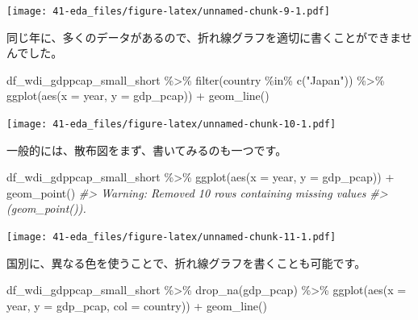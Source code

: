 \documentclass[
]{bxjsbook}
\newenvironment{Shaded}{\begin{snugshade}}{\end{snugshade}}
\newcommand{\AttributeTok}[1]{\textcolor[rgb]{0.77,0.63,0.00}{#1}}
\newcommand{\CommentTok}[1]{\textcolor[rgb]{0.56,0.35,0.01}{\textit{#1}}}
\newcommand{\FunctionTok}[1]{\textcolor[rgb]{0.00,0.00,0.00}{#1}}
\newcommand{\NormalTok}[1]{#1}
\newcommand{\SpecialCharTok}[1]{\textcolor[rgb]{0.00,0.00,0.00}{#1}}
\newcommand{\StringTok}[1]{\textcolor[rgb]{0.31,0.60,0.02}{#1}}
\theoremstyle{definition}
\theoremstyle{definition}
\theoremstyle{definition}
\theoremstyle{definition}
\theoremstyle{remark}
\begin{document}
\texttt{[image: 41-eda\_files/figure-latex/unnamed-chunk-9-1.pdf]}

同じ年に、多くのデータがあるので、折れ線グラフを適切に書くことができませんでした。

\begin{Shaded}
\begin{Highlighting}[]
\NormalTok{df\_wdi\_gdppcap\_small\_short }\SpecialCharTok{\%\textgreater{}\%} \FunctionTok{filter}\NormalTok{(country }\SpecialCharTok{\%in\%} \FunctionTok{c}\NormalTok{(}\StringTok{"Japan"}\NormalTok{)) }\SpecialCharTok{\%\textgreater{}\%}
  \FunctionTok{ggplot}\NormalTok{(}\FunctionTok{aes}\NormalTok{(}\AttributeTok{x =}\NormalTok{ year, }\AttributeTok{y =}\NormalTok{ gdp\_pcap)) }\SpecialCharTok{+} \FunctionTok{geom\_line}\NormalTok{()}
\end{Highlighting}
\end{Shaded}

\texttt{[image: 41-eda\_files/figure-latex/unnamed-chunk-10-1.pdf]}

一般的には、散布図をまず、書いてみるのも一つです。

\begin{Shaded}
\begin{Highlighting}[]
\NormalTok{df\_wdi\_gdppcap\_small\_short }\SpecialCharTok{\%\textgreater{}\%}
  \FunctionTok{ggplot}\NormalTok{(}\FunctionTok{aes}\NormalTok{(}\AttributeTok{x =}\NormalTok{ year, }\AttributeTok{y =}\NormalTok{ gdp\_pcap)) }\SpecialCharTok{+} \FunctionTok{geom\_point}\NormalTok{()}
\CommentTok{\#\textgreater{} Warning: Removed 10 rows containing missing values}
\CommentTok{\#\textgreater{} (\textasciigrave{}geom\_point()\textasciigrave{}).}
\end{Highlighting}
\end{Shaded}

\texttt{[image: 41-eda\_files/figure-latex/unnamed-chunk-11-1.pdf]}

国別に、異なる色を使うことで、折れ線グラフを書くことも可能です。

\begin{Shaded}
\begin{Highlighting}[]
\NormalTok{df\_wdi\_gdppcap\_small\_short }\SpecialCharTok{\%\textgreater{}\%} \FunctionTok{drop\_na}\NormalTok{(gdp\_pcap) }\SpecialCharTok{\%\textgreater{}\%}
  \FunctionTok{ggplot}\NormalTok{(}\FunctionTok{aes}\NormalTok{(}\AttributeTok{x =}\NormalTok{ year, }\AttributeTok{y =}\NormalTok{ gdp\_pcap, }\AttributeTok{col =}\NormalTok{ country)) }\SpecialCharTok{+} \FunctionTok{geom\_line}\NormalTok{()}
\end{Highlighting}
\end{Shaded}
\end{document}
